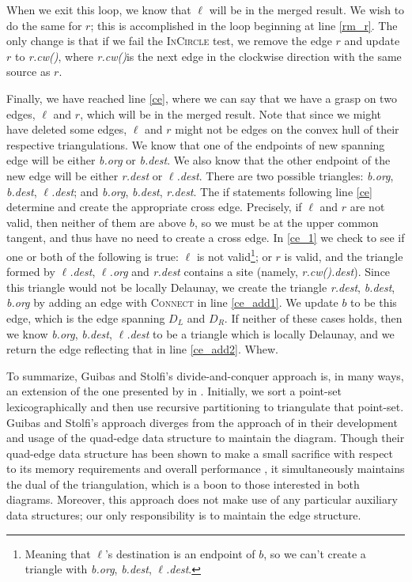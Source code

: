 \documentclass[12pt,twoside]{reedthesis}
\begin{document}
        When we exit this loop, we know that $\ell$ will be in the merged result. We wish to do the same for $r$; this is accomplished in the loop beginning at line \ref{rm_r}. The only change is that if we fail the \textsc{InCircle} test, we remove the edge $r$ and update $r$ to \textit{r.cw()}, where \textit{r.cw()}is the next edge in the clockwise direction with the same source as $r$.\par

        Finally, we have reached line \ref{ce}, where we can say that we have a grasp on two edges, $\ell$ and $r$, which will be in the merged result. Note that since we might have deleted some edges, $\ell$ and $r$ might not be edges on the convex hull of their respective triangulations. We know that one of the endpoints of new spanning edge will be either \textit{b.org} or \textit{b.dest}. We also know that the other endpoint of the new edge will be either \textit{r.dest} or \textit{$\ell$.dest}. There are two possible triangles: \textit{b.org}, \textit{b.dest}, \textit{$\ell$.dest}; and \textit{b.org}, \textit{b.dest}, \textit{r.dest}. The if statements following line \ref{ce} determine and create the appropriate cross edge. Precisely, if $\ell$ and $r$ are not valid, then neither of them are above $b$, so we must be at the upper common tangent, and thus have no need to create a cross edge. In \ref{ce_1} we check to see if one or both of the following is true: $\ell$ is not valid\footnote{Meaning that $\ell$'s destination is an endpoint of $b$, so we can't create a triangle with \textit{b.org}, \textit{b.dest}, \textit{$\ell$.dest}.}; or $r$ is valid, and the triangle formed by \textit{$\ell$.dest}, \textit{$\ell$.org} and \textit{r.dest} contains a site (namely, \textit{r.cw().dest}). Since this triangle would not be locally Delaunay, we create the triangle \textit{r.dest}, \textit{b.dest}, \textit{b.org} by adding an edge with \textsc{Connect} in line \ref{ce_add1}. We update $b$ to be this edge, which is the  edge spanning $D_{L}$ and $D_{R}$. If neither of these cases holds, then we know \textit{b.org}, \textit{b.dest}, \textit{$\ell$.dest} to be a triangle which is locally Delaunay, and we return the edge reflecting that in line \ref{ce_add2}. Whew.\par

        To summarize, Guibas and Stolfi's divide-and-conquer approach is, in many ways, an extension of the one presented by \textcite{lee_div_conq} in \citeyear{lee_div_conq}. Initially, we sort a point-set lexicographically and then use recursive partitioning to triangulate that point-set. Guibas and Stolfi's approach diverges from the approach of \citeauthor{lee_div_conq} in their development and usage of the quad-edge data structure to maintain the diagram. Though their quad-edge data structure has been shown to make a small sacrifice with respect to its memory requirements and overall performance \cite{shewchuk1996,leach92}, it simultaneously maintains the dual of the triangulation, which is a boon to those interested in both diagrams. Moreover, this approach does not make use of any particular auxiliary data structures; our only responsibility is to maintain the edge structure.  
\end{document}
